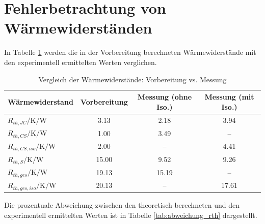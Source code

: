 \section{Fehlerbetrachtung von Wärmewiderständen}
\label{scn:fehler_waermewiderstand}
In Tabelle \ref{tab:vergleich_rth} werden die in der Vorbereitung berechneten Wärmewiderstände mit den experimentell ermittelten Werten verglichen.

\begin{table}[H]
    \centering
    \renewcommand{\arraystretch}{1.3}
    \begin{tabular}{l|c|c|c}
        \toprule
        \textbf{Wärmewiderstand}                  & \textbf{Vorbereitung} & \textbf{Messung (ohne Iso.)} & \textbf{Messung (mit Iso.)} \\
        \midrule
        $R_{th,JC}/{\si{\kelvin\per\watt}}$       & \num{3.13}            & \num{2.18}                   & \num{3.94}                  \\
        $R_{th,CS}/{\si{\kelvin\per\watt}}$       & \num{1.00}            & \num{3.49}                   & --                          \\
        $R_{th,CS, iso}/{\si{\kelvin\per\watt}}$  & \num{2.00}            & --                           & \num{4.41}                  \\
        $R_{th,S}/{\si{\kelvin\per\watt}}$        & \num{15.00}           & \num{9.52}                   & \num{9.26}                  \\
        \midrule
        $R_{th,ges}/{\si{\kelvin\per\watt}}$      & \num{19.13}           & \num{15.19}                  & --                          \\
        $R_{th,ges, iso}/{\si{\kelvin\per\watt}}$ & \num{20.13}           & --                           & \num{17.61}                 \\
        \bottomrule
    \end{tabular}
    \caption{Vergleich der Wärmewiderstände: Vorbereitung vs. Messung}
    \label{tab:vergleich_rth}
\end{table}

Die prozentuale Abweichung zwischen den theoretisch berechneten und den experimentell ermittelten Werten ist in Tabelle \ref{tab:abweichung_rth} dargestellt.

